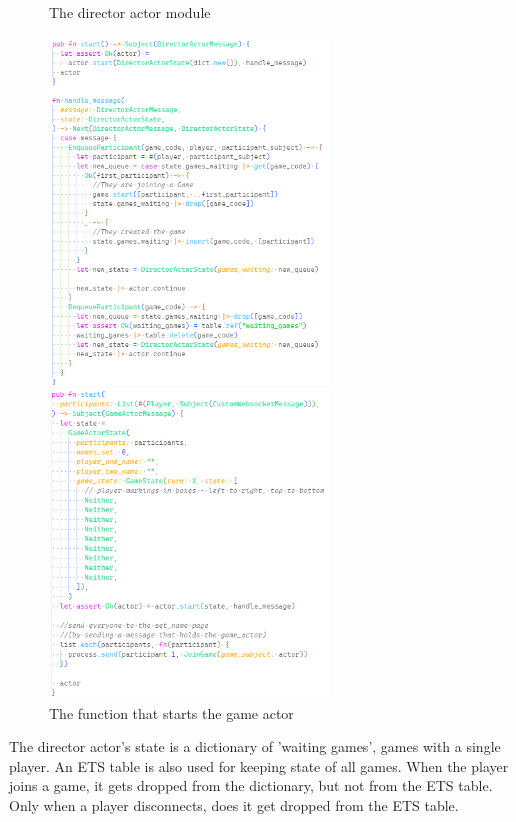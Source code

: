 \documentclass[]{project_interim}
\begin{document}
\begin{figure}
  \caption{The director actor module}\label{wrap-fig:5}
  \vspace*{0.5cm}
  \includegraphics[width=20em]{director_actor}
  \caption{The function that starts the game actor}\label{wrap-fig:6}
  \vspace*{0.5cm}
  \includegraphics[width=20em]{new_game_actor}
\end{figure}

\vspace*{2em}
The director actor's state is a dictionary of 'waiting games',
games with a single player. An ETS table is also used for keeping
state of all games. When the player joins a game, it gets dropped
from the dictionary, but not from the ETS table. Only when a player
disconnects, does it get dropped from the ETS table.

\vspace*{20em}
\end{document}
